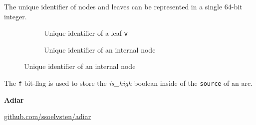\documentclass[english, aspectratio=169]{beamer}
\begin{document}
\begin{frame}
  The unique identifier of nodes and leaves can be represented in a single 64-bit
  integer.
  
  \begin{figure}
  \begin{subfigure}[b]{0.49\linewidth}
    \centering

    \begin{tikzpicture}
      
    \end{tikzpicture}

    \caption{Unique identifier of a leaf \texttt{v}}
  \end{subfigure}
  \begin{subfigure}[b]{0.49\linewidth}
    \centering

    \begin{tikzpicture}
      
    \end{tikzpicture}
    
    \caption{Unique identifier of an internal node}
  \end{subfigure}
  \end{figure}

  The \texttt{f} bit-flag is used to store the \emph{is\_high} boolean inside of
  the \texttt{source} of an arc.
  
\end{frame}

\begin{frame}{} %
  \pause

  \begin{center}
    {\Huge \textbf{Adiar}}

    \vspace{12pt}
    
    \textcolor{gray}{\small
      \href{http://github.com/ssoelvsten/adiar}{github.com/ssoelvsten/adiar}
    }
  \end{center}
\end{frame}
\end{document}
